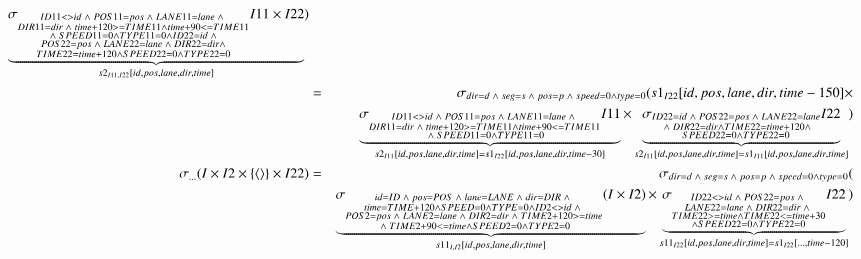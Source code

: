 \begin{eqnarray}
\underbrace{\sigma_{\substack{ID11 <> id \;\wedge\; POS11 = pos \;\wedge\;  LANE11 = lane \;\wedge\;\\ DIR11=dir \;\wedge\; time + 120 >= TIME11 \wedge time + 90 <= TIME11 \\\;\wedge\;  SPEED11 = 0 \wedge TYPE11 = 0 \wedge ID22 = id \;\wedge\;\\ POS22 = pos \;\wedge\;  LANE22 = lane \;\wedge\; DIR22 = dir \wedge\\TIME22 = time + 120 \wedge SPEED22 = 0 \wedge TYPE22 =0 }} I11 \times I22}_{s2_{I11,I22}[id, pos, lane, dir, time]})\\
&=&
\sigma_{\substack{dir = d \;\wedge\; seg = s \;\wedge\; pos = p \;\wedge\; speed = 0 \wedge type = 0 }}(s1_{I22}[id, pos, lane, dir, time-150] \times \\
\nonumber{}&&
\underbrace{\sigma_{\substack{ID11 <> id \;\wedge\; POS11 = pos \;\wedge\;  LANE11 = lane \;\wedge\;\\ DIR11=dir \;\wedge\; time + 120 >= TIME11 \wedge time + 90 <= TIME11 \\\;\wedge\; SPEED11 = 0 \wedge TYPE11 = 0}} I11}_{s2_{I11}[id, pos, lane, dir, time] = s1_{I22}[id, pos, lane, dir, time-30]} \times \underbrace{\sigma_{\substack{ ID22 = id \;\wedge\; POS22 = pos \;\wedge\;  LANE22 = lane \\\;\wedge\; DIR22 = dir \wedge TIME22 = time + 120 \wedge\\ SPEED22 = 0 \wedge TYPE22 =0 }} I22}_{s2_{I11}[id, pos, lane, dir, time]=s1_{I11}[id, pos, lane, dir, time]})\\
\sigma_{\dots}(I \times  I2 \times  \{\tuple{} \} \times I22) &=&
\sigma_{\substack{dir = d \;\wedge\; seg = s \;\wedge\; pos = p \;\wedge\; speed = 0 \wedge type = 0  }}(\\
\nonumber{}&& \underbrace{\sigma_{\substack{id = ID \;\wedge\; pos = POS \;\wedge\;  lane = LANE \;\wedge\; dir=DIR \;\wedge\;\\ time = TIME + 120 \wedge SPEED = 0 \wedge TYPE = 0 \wedge ID2 <> id \;\wedge\; \\POS2 = pos \;\wedge\; LANE2 = lane \;\wedge\; DIR2 = dir \;\wedge\; TIME2 +120 >= time \\\;\wedge\; TIME2 + 90 <= time \wedge SPEED2 = 0 \wedge TYPE2 = 0 }} (I \times  I2)}_{s11_{I, I2}[id, pos, lane, dir, time]} \times  
\underbrace{\sigma_{\substack{ID22 <> id \;\wedge\; POS22 = pos \;\wedge\; \\ LANE22 = lane \;\wedge\; DIR22 = dir \;\wedge\;\\ TIME22 >= time \wedge TIME22 <= time + 30 \\\wedge SPEED22 = 0 \wedge TYPE22 =0}} I22}_{s11_{I22}[id, pos, lane, dir, time] = s1_{I22}[\dots, time-120]}) \\

\end{eqnarray}
